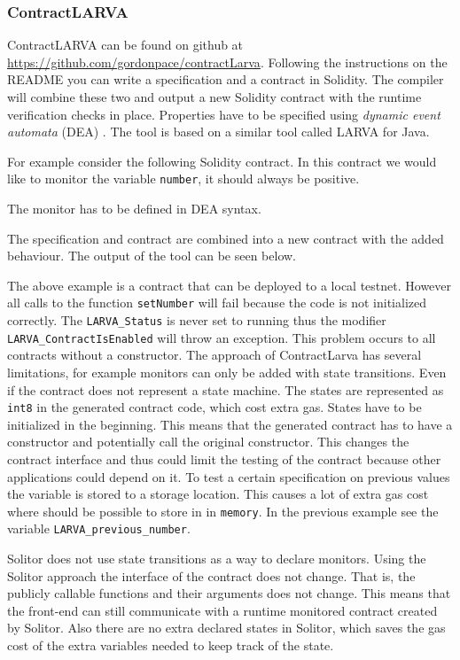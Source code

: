 \documentclass[a4paper]{article}
\begin{document}
\subsubsection{ContractLARVA}
ContractLARVA can be found on github at \url{https://github.com/gordonpace/contractLarva}. Following the instructions on the README you can write a specification and a contract in Solidity. The compiler will combine these two and output a new Solidity contract with the runtime verification checks in place. Properties have to be specified using \textit{dynamic event automata} (DEA) \cite{CGG08FMICS}. The tool is based on a similar tool called LARVA for Java. \par
For example consider the following Solidity contract. In this contract we would like to monitor the variable \texttt{number}, it should always be positive.

The monitor has to be defined in DEA syntax.

The specification and contract are combined into a new contract with the added behaviour. The output of the tool can be seen below.

The above example is a contract that can be deployed to a local testnet. However all calls to the function \texttt{setNumber} will fail because the code is not initialized correctly. The \texttt{LARVA\_Status} is never set to running thus the modifier \texttt{LARVA\_ContractIsEnabled} will throw an exception. This problem occurs to all contracts without a constructor. The approach of ContractLarva has several limitations, for example monitors can only be added with state transitions. Even if the contract does not represent a state machine. The states are represented as \texttt{int8} in the generated contract code, which cost extra gas. States have to be initialized in the beginning. This means that the generated contract has to have a constructor and potentially call the original constructor. This changes the contract interface and thus could limit the testing of the contract because other applications could depend on it. To test a certain specification on previous values the variable is stored to a storage location. This causes a lot of extra gas cost where should be possible to store in in \texttt{memory}. In the previous example see the variable \texttt{LARVA\_previous\_number}. \par
Solitor does not use state transitions as a way to declare monitors. Using the Solitor approach the interface of the contract does not change. That is, the publicly callable functions and their arguments does not change. This means that the front-end can still communicate with a runtime monitored contract created by Solitor. Also there are no extra declared states in Solitor, which saves the gas cost of the extra variables needed to keep track of the state.
\end{document}
